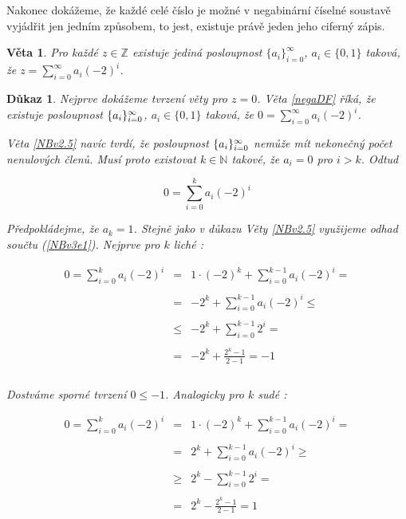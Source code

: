 \documentclass[12pt]{book}
\newtheorem{veta}{Věta}
\newtheorem*{dukaz}{Důkaz}
\begin{document}
Nakonec dokážeme, že každé celé číslo je možné v negabinární číselné soustavě vyjádřit jen jedním způsobem, to jest, existuje právě jeden jeho ciferný zápis.

\begin{veta}\label{NBv3}
	Pro každé $z\in\mathbb{Z}$ existuje jediná posloupnost $\{a_i\}_{i=0}^\infty$, $a_i \in\{0,1\}$ taková, že $z = \sum_{i=0}^{\infty}a_i(-2)^i$.
\end{veta}

\begin{dukaz}
Nejprve dokážeme tvrzení věty pro $z = 0$. Věta \ref{negaDF} říká, že existuje posloupnost $\{a_i\}_{i=0}^{\infty}$, $a_i \in \{0, 1\}$ taková, že $ 0 = \sum_{i=0}^{\infty}a_i(-2)^i$.

Věta \ref{NBv2.5} navíc tvrdí, že posloupnost $\{a_i\}_{i=0}^{\infty}$ nemůže mít nekonečný počet nenulových členů. Musí proto existovat $k \in \mathbb{N}$ takové, že  $a_i = 0$ pro $i > k$. Odtud

\begin{equation}\label{NBv3e1}
  0 = \sum_{i=0}^{k}a_i(-2)^i
\end{equation}

Předpokládejme, že $a_k = 1$. Stejně jako v důkazu Věty \ref{NBv2.5} využijeme odhad součtu (\ref{NBv3e1}). Nejprve pro $k$ liché :

 \begin{equation}\label{NBv3e2}
 \begin{array}{rcl}
0 = \sum_{i=0}^{k}a_i(-2)^i & = & 1\cdot(-2)^{k} + \sum_{i=0}^{k-1}a_i(-2)^i = \\
 &  & \\
 & = &  - 2^{k} + \sum_{i=0}^{k-1}a_i(-2)^i \leq \\
 &  & \\
 & \leq & - 2^{k} + \sum_{i=0}^{k-1}2^i = \\
 &  & \\
 & =    & \displaystyle{- 2^{k} + \frac{2^{k} - 1}{2-1} = -1}\\
 &  & \\
 \end{array}
 \end{equation}

Dostváme sporné tvrzení $0 \leq -1$. Analogicky pro $k$ sudé :

 \begin{equation}\label{NBv3e3}
 \begin{array}{rcl}
0 = \sum_{i=0}^{k}a_i(-2)^i & = & 1\cdot(-2)^{k} + \sum_{i=0}^{k-1}a_i(-2)^i = \\
 &  & \\
 & = &  2^{k} + \sum_{i=0}^{k-1}a_i(-2)^i \geq \\
 &  & \\
 & \geq & 2^{k} - \sum_{i=0}^{k-1}2^i = \\
 &  & \\
 & =    & \displaystyle{ 2^{k} - \frac{2^{k} - 1}{2-1} = 1}\\
 &  & \\
 \end{array}
 \end{equation}


\end{dukaz}
\end{document}
